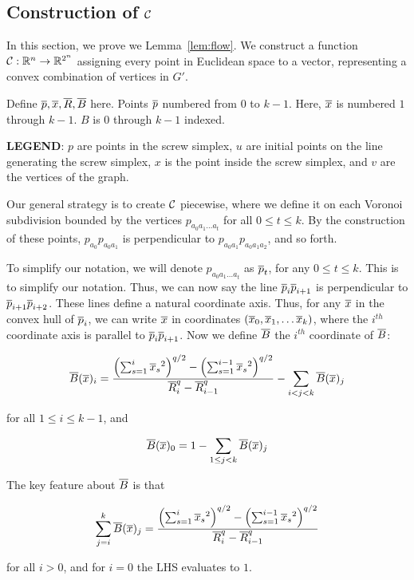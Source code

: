 \subsection{Construction of $\mathcal{C}$}

In this section, we prove we Lemma~\ref{lem:flow}. We construct a function
$\mathcal{C}:\mathbb{R}^n \rightarrow \mathbb{R}^{2^n}$ assigning every point in
Euclidean space to a vector, representing a convex combination of vertices
in $G'$.

Define $\overline{p}, \overline{x}, \overline{R}, \overline{B}$ here. Points $\overline{p}$ numbered from $0$ to $k-1$.
Here, $\overline{x}$ is numbered $1$ through $k-1$. $B$ is $0$ through $k-1$
indexed.

\textbf{LEGEND}: $p$ are points in the screw simplex, $u$ are initial
points on the line generating the screw simplex, $x$ is the point inside
the screw simplex, and $v$ are the vertices of the graph.

Our general strategy is to create $\mathcal{C}$ piecewise, where we define it on
each Voronoi subdivision bounded by the vertices $ p_{a_0a_1\ldots a_t}$
for all $0 \leq t \leq k$. By the construction of these points,
$p_{a_0}p_{a_0a_1}$ is perpendicular to $p_{a_0a_1}p_{a_0a_1a_2}$, and so
forth.

To simplify our notation, we will denote $p_{a_0a_1\ldots a_t}$ as $\overline{p}_t$,
for any $0 \leq t \leq k$. This is to simplify our notation. Thus, we can
now say the line $\overline{p}_{i}\overline{p}_{i+1}$ is perpendicular to
$\overline{p}_{i+1}\overline{p}_{i+2}$. These lines define a natural coordinate axis. Thus,
for any $\overline{x}$ in the convex hull of $\overline{p}_i$, we can write $\overline{x}$ in
coordinates $(\overline{x}_0, \overline{x}_1, \ldots \overline{x}_k)$, where the $i^{th}$ coordinate
axis is parallel to $\overline{p}_i \overline{p}_{i+1}$. Now we define $\overline{B}$ the $i^{th}$
coordinate of $\overline{B}$:

\begin{align}
\overline{B}(\overline{x})_i = \frac{
\left(\sum_{s=1}^i {\overline{x}_s}^2\right)^{q/2} -\left(\sum_{s=1}^{i-1}
{\overline{x}_s}^2\right)^{q/2}
}
{
\overline{R}_i^q - \overline{R}_{i-1}^q
} - \sum_{i < j < k} \overline{B}(\overline{x})_j
\end{align}

for all $1 \leq i \leq k-1$, and

\[ \overline{B}(\overline{x})_0 = 1 - \sum_{1 \leq j < k} \overline{B}(\overline{x})_j
\]

The key feature about $\overline{B}$ is that

\[\sum_{j=i}^k \overline{B}(\overline{x})_j= \frac{
\left(\sum_{s=1}^i {\overline{x}_s}^2\right)^{q/2} -\left(\sum_{s=1}^{i-1}
{\overline{x}_s}^2\right)^{q/2}
}
{
\overline{R}_i^q - \overline{R}_{i-1}^q
}\]

for all $i > 0$, and for $i = 0$ the LHS evaluates to $1$.

